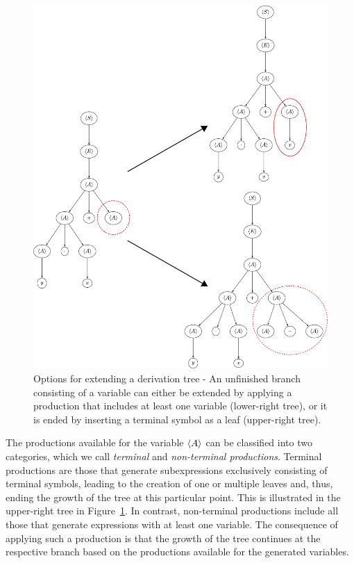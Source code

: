 \begin{figure}
	\centering
	\includegraphics[scale=0.46]{figures/trees/gp_grow_tree_options.pdf}
	\caption{Options for extending a derivation tree - An unfinished branch consisting of a variable can either be extended by applying a production that includes at least one variable (lower-right tree), or it is ended by inserting a terminal symbol as a leaf (upper-right tree).}
	\label{fig:gp-tree-growing-options}
\end{figure}
The productions available for the variable $\langle A \rangle$ can be classified into two categories, which we call \emph{terminal} and \emph{non-terminal productions}.
Terminal productions are those that generate subexpressions exclusively consisting of terminal symbols, leading to the creation of one or multiple leaves and, thus, ending the growth of the tree at this particular point.
This is illustrated in the upper-right tree in Figure~\ref{fig:gp-tree-growing-options}.
In contrast, non-terminal productions include all those that generate expressions with at least one variable.
The consequence of applying such a production is that the growth of the tree continues at the respective branch based on the productions available for the generated variables.

